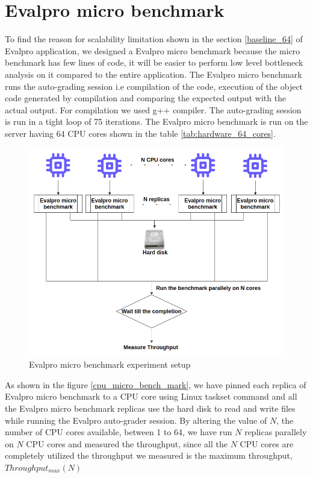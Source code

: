 \documentclass{iitbreport}
\begin{document}
\section{Evalpro micro benchmark}\label{evalpro_micro_benchmark_section}
To find the reason for scalability limitation shown in the section \ref{baseline_64} of Evalpro application, we designed a Evalpro micro benchmark because the micro benchmark has few lines of code, it will be easier to perform low level bottleneck analysis on it  compared to the entire application. The  Evalpro micro benchmark runs the auto-grading session i.e compilation of the code, execution of the object code generated by compilation and comparing the expected output with  the actual output. For compilation we used g++ compiler. The auto-grading session is run in a tight loop of 75 iterations. The Evalpro micro benchmark is run on the server having 64 CPU cores shown in the table \ref{tab:hardware_64_cores}.
\begin{figure}[!htb]
  \centering
  \includegraphics[width=\linewidth]{Images/evalpro_micro_benchmark.png}
  \caption{Evalpro micro benchmark experiment setup}
  \label{evalpro_micro_bench_mark}
 
\end{figure}

As shown in the figure \ref{cpu_micro_bench_mark}, we have pinned each replica of Evalpro micro benchmark to a CPU core using Linux taskset command and all the Evalpro micro benchmark replicas use the hard disk to read and write files while running the Evalpro auto-grader session. By altering the value of $N$, the number of CPU cores available, between 1 to 64, we have run $N$ replicas parallely on $N$ CPU cores and measured the throughput, since all the $N$ CPU cores are completely utilized the throughput we measured is the maximum throughput,  $Throughput_{max}(N)$
\end{document}
